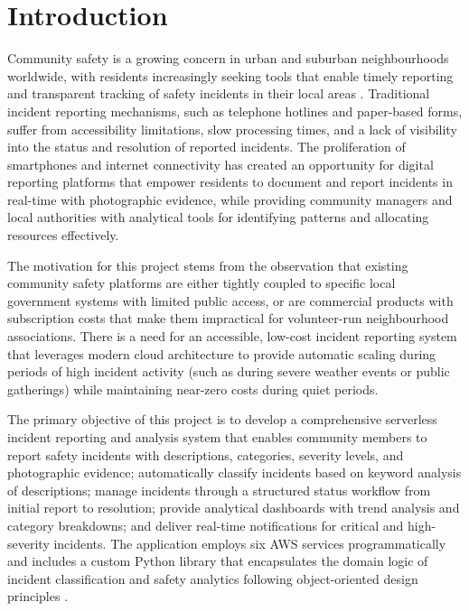 \documentclass[conference]{IEEEtran}
\begin{document}
\section{Introduction}

Community safety is a growing concern in urban and suburban neighbourhoods worldwide, with residents increasingly seeking tools that enable timely reporting and transparent tracking of safety incidents in their local areas \cite{communitysafety}. Traditional incident reporting mechanisms, such as telephone hotlines and paper-based forms, suffer from accessibility limitations, slow processing times, and a lack of visibility into the status and resolution of reported incidents. The proliferation of smartphones and internet connectivity has created an opportunity for digital reporting platforms that empower residents to document and report incidents in real-time with photographic evidence, while providing community managers and local authorities with analytical tools for identifying patterns and allocating resources effectively.

The motivation for this project stems from the observation that existing community safety platforms are either tightly coupled to specific local government systems with limited public access, or are commercial products with subscription costs that make them impractical for volunteer-run neighbourhood associations. There is a need for an accessible, low-cost incident reporting system that leverages modern cloud architecture to provide automatic scaling during periods of high incident activity (such as during severe weather events or public gatherings) while maintaining near-zero costs during quiet periods.

The primary objective of this project is to develop a comprehensive serverless incident reporting and analysis system that enables community members to report safety incidents with descriptions, categories, severity levels, and photographic evidence; automatically classify incidents based on keyword analysis of descriptions; manage incidents through a structured status workflow from initial report to resolution; provide analytical dashboards with trend analysis and category breakdowns; and deliver real-time notifications for critical and high-severity incidents. The application employs six AWS services programmatically and includes a custom Python library that encapsulates the domain logic of incident classification and safety analytics following object-oriented design principles \cite{cloudpatterns}.
\end{document}
